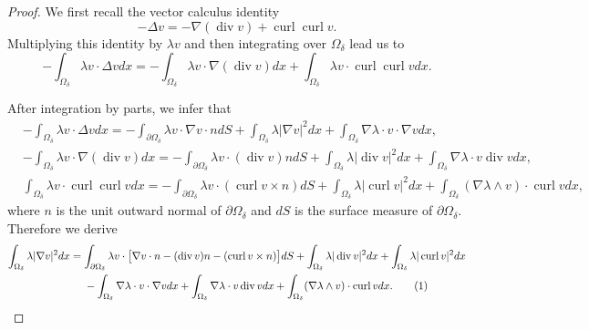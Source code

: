 \documentclass[10pt,reqno]{amsart}
\numberwithin{equation}{section}
\begin{document}
\begin{proof}
We first recall the vector calculus identity 
\begin{equation*}
	-\Delta v=-\nabla(\operatorname{div}v)+\operatorname{curl}\operatorname{curl}v.
\end{equation*}
Multiplying this identity by $\lambda v$ and then integrating over $\Omega_\delta$ lead us to 
\begin{equation*} 
	-\int_{\Omega_\delta}\lambda v\cdot \Delta vdx=-\int_{\Omega_\delta}\lambda v\cdot \nabla(\operatorname{div}v)dx+\int_{\Omega_\delta}\lambda v\cdot \operatorname{curl}\operatorname{curl}vdx.
\end{equation*}

After integration by parts, we infer that
\begin{align*}
	&-\int_{\Omega_\delta}\lambda v\cdot \Delta vdx		
	=-\int_{\partial\Omega_\delta} \lambda v\cdot \nabla v\cdot ndS+\int_{\Omega_\delta} \lambda|\nabla v|^2dx+\int_{\Omega_\delta}\nabla \lambda\cdot v\cdot \nabla vdx,\\
	&-\int_{\Omega_\delta}\lambda v\cdot \nabla(\operatorname{div}v)dx
	=-\int_{\partial\Omega_\delta} \lambda v\cdot (\operatorname{div} v) ndS+\int_{\Omega_\delta} \lambda|\operatorname{div} v|^2dx+\int_{\Omega_\delta}\nabla \lambda\cdot  v \operatorname{div} vdx,\\
	&\int_{\Omega_\delta}\lambda v\cdot \operatorname{curl}\operatorname{curl}vdx
	=-\int_{\partial\Omega_\delta} \lambda v\cdot (\operatorname{curl} v\times n)dS+\int_{\Omega_\delta} \lambda|\operatorname{curl} v|^2dx+\int_{\Omega_\delta}(\nabla \lambda\wedge v)\cdot \operatorname{curl} vdx,
\end{align*}
where $n$ is the unit outward normal of $\partial\Omega_{\delta}$ and $dS$ is the surface measure of $\partial\Omega_{\delta}$. 
Therefore we derive
\begin{align*}
	\int_{\Omega_\delta} \lambda|\nabla v|^2dx&=\int_{\partial\Omega_\delta} \lambda v\cdot \big[\nabla v\cdot n-
	(\operatorname{div}v) n-(\operatorname{curl}v\times n)\big]dS+\int_{\Omega_\delta} \lambda|\operatorname{div} v|^2dx+\int_{\Omega_\delta} \lambda|\operatorname{curl} v|^2dx\\
	&\ \ \ \ -\int_{\Omega_\delta}\nabla \lambda\cdot v\cdot \nabla vdx+\int_{\Omega_\delta}\nabla \lambda\cdot v \operatorname{div} vdx+\int_{\Omega_\delta}(\nabla \lambda\wedge v)\cdot \operatorname{curl} vdx.\stepcounter{equation}\tag{\theequation}\label{div1}
\end{align*}


\end{proof}
\end{document}
